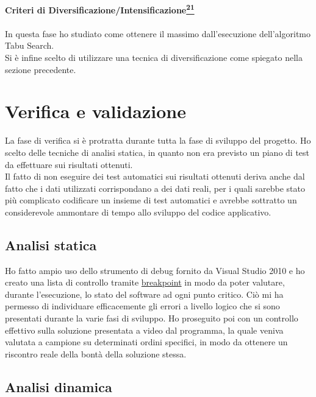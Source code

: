 \textbf{Criteri di Diversificazione/Intensificazione\hyperref[criteria]{\textsuperscript{21}}}\\ \\
In questa fase ho studiato come ottenere il massimo dall'esecuzione dell'algoritmo Tabu Search.\\
Si è infine scelto di utilizzare una tecnica di diversificazione come spiegato nella sezione precedente.

\newpage

\section{Verifica e validazione}

La fase di verifica si è protratta durante tutta la fase di sviluppo del progetto. Ho scelto delle tecniche di analisi statica, in quanto non era previsto un piano di test
da effettuare sui risultati ottenuti.\\ Il fatto di non eseguire dei test automatici sui risultati ottenuti deriva anche dal fatto che i dati utilizzati corrispondano
a dei dati reali, per i quali sarebbe stato più complicato codificare un insieme di test automatici e avrebbe sottratto un considerevole ammontare di tempo allo sviluppo del
codice applicativo. 

\subsection{Analisi statica}

Ho fatto ampio uso dello strumento di debug fornito da Visual Studio 2010 e ho creato una lista di controllo tramite \hyperref[Breakpoint]{breakpoint\glo} in modo da poter
valutare, durante l'esecuzione, lo stato del software ad ogni punto critico. Ciò mi ha permesso di individuare efficacemente gli errori a livello logico che si sono presentati
durante la varie fasi di sviluppo. Ho proseguito poi con un controllo effettivo sulla soluzione presentata a video dal programma, la quale veniva valutata a campione su determinati 
ordini specifici, in modo da ottenere un riscontro reale della bontà della soluzione stessa. 

\subsection{Analisi dinamica}

